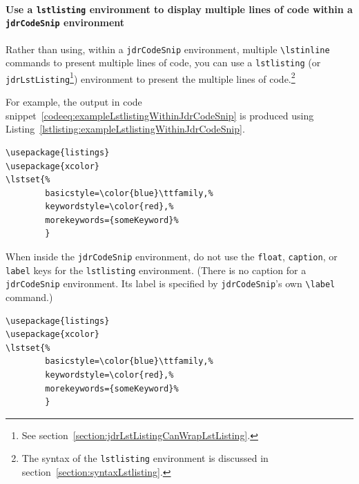 \documentclass[12pt,table,final]{article}%
\begin{document}
\paragraph{Use a \lstinline|lstlisting| environment to display multiple lines of code within a \lstinline|jdrCodeSnip| environment}
\label{section:lstlistingWithinJdrCodeSnip}
Rather than using, within a \lstinline|jdrCodeSnip| environment, multiple \lstinline|\lstinline| commands to present multiple lines of code, you can use a \lstinline|lstlisting| (or \lstinline|jdrLstListing|\footnote{See section~\ref{section:jdrLstListingCanWrapLstListing}.}) environment to present the multiple lines of code.\footnote{The syntax of the \lstinline|lstlisting| environment is discussed in section~\ref{section:syntaxLstlisting}.}

For example, the output in code snippet~\ref{codeeq:exampleLstlistingWithinJdrCodeSnip} is produced using Listing~\ref{lstlisting:exampleLstlistingWithinJdrCodeSnip}.
\begin{jdrCodeSnip}
\label{codeeq:exampleLstlistingWithinJdrCodeSnip}
\begin{lstlisting}
\usepackage{listings}
\usepackage{xcolor}
\lstset{%
        basicstyle=\color{blue}\ttfamily,%
        keywordstyle=\color{red},%
        morekeywords={someKeyword}%
        }
\end{lstlisting}
\end{jdrCodeSnip}

When inside the \lstinline|jdrCodeSnip| environment, do not use the \lstinline|float|, \lstinline|caption|, or \lstinline|label| keys for the \lstinline|lstlisting| environment. (There is no caption for a \lstinline|jdrCodeSnip| environment. Its label is specified by \lstinline|jdrCodeSnip|'s own \lstinline|\label| command.)

\begin{jdrLstListing}%
    [%
    caption={Example of \lstinline|lstlisting| environment within \lstinline|jdrCodeSnip| environment},%
    label=lstlisting:exampleLstlistingWithinJdrCodeSnip,%
    ]
\begin{jdrCodeSnip}
\label{codeeq:exampleLstlistingWithinJdrCodeSnip}
\begin{lstlisting}
\usepackage{listings}
\usepackage{xcolor}
\lstset{%
        basicstyle=\color{blue}\ttfamily,%
        keywordstyle=\color{red},%
        morekeywords={someKeyword}%
        }
\end{lstlisting}
\end{jdrCodeSnip}
\end{jdrLstListing}
\end{document}
